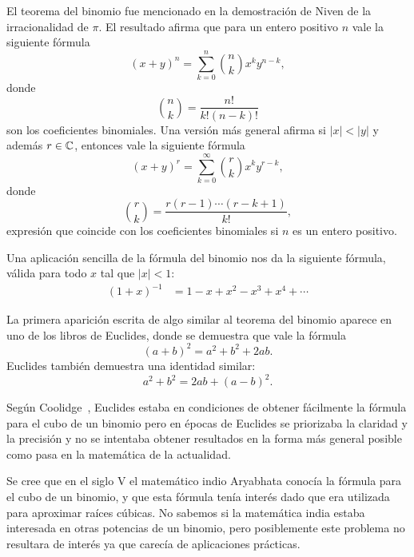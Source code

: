 El teorema del binomio fue mencionado en la demostración de Niven de la
irracionalidad de $\pi$. El resultado afirma que para un entero positivo $n$ vale la siguiente fórmula
\[
	(x+y)^n=\sum_{k=0}^n\binom{n}{k}x^ky^{n-k},
\]
donde
\[
	\binom{n}{k}=\frac{n!}{k!(n-k)!}
\]
son los coeficientes binomiales. Una versión más general afirma si $|x|<|y|$ y además 
$r\in\mathbb{C}$, entonces vale la siguiente fórmula 
\[
	(x+y)^r=\sum_{k=0}^\infty\binom{r}{k}x^{k}y^{r-k},
\]
donde 
\[
	\binom{r}{k}=\frac{r(r-1)\cdots (r-k+1)}{k!},
\]
expresión que coincide con los coeficientes binomiales si $n$ es un entero
positivo. 

\begin{example}
	Una aplicación sencilla de la fórmula del binomio nos da la siguiente fórmula, válida 
	para todo $x$ tal que $|x|<1$:
	\begin{align*}
		(1+x)^{-1}&=1-x+x^2-x^3+x^4+\cdots
	\end{align*}
\end{example}


La primera aparición escrita de algo similar al
teorema del binomio aparece en uno de los libros de Euclides, donde se
demuestra que vale la fórmula
\[
	(a+b)^2=a^2+b^2+2ab.
\]
Euclides también demuestra una identidad similar:
\[
	a^2+b^2=2ab+(a-b)^2.
\]

Según Coolidge~\cite{MR28222}, Euclides estaba en condiciones de obtener
fácilmente la fórmula para el cubo de un binomio pero en épocas de Euclides se
priorizaba la claridad y la precisión y no se intentaba obtener resultados en
la forma más general posible como pasa en la matemática de la actualidad.  

Se cree que en el siglo V el matemático indio Aryabhata conocía la fórmula para el
cubo de un binomio, y que esta fórmula tenía interés dado que era utilizada
para aproximar raíces cúbicas. No sabemos si la matemática india estaba
interesada en otras potencias de un binomio, pero posiblemente este problema no
resultara de interés ya que carecía de aplicaciones prácticas. 

